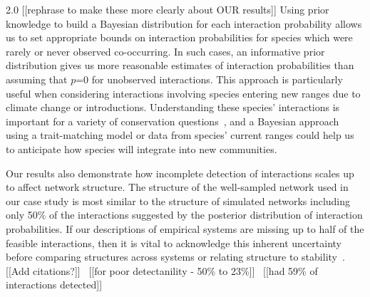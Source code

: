 \documentclass[12pt]{article}
\begin{document}
\begin{spacing}{2.0}
  [[rephrase to make these more clearly about OUR results]]
  Using prior knowledge to build a Bayesian distribution for each interaction probability allows us to set appropriate bounds on interaction probabilities for species which were rarely or never observed co-occurring. In such cases, an informative prior distribution gives us more reasonable estimates of interaction probabilities than assuming that $p$=0 for unobserved interactions. This approach is particularly useful when considering interactions involving species entering new ranges due to climate change or introductions. Understanding these species' interactions is important for a variety of conservation questions~\citep{Bartomeus2013,Gravel2013}, and a Bayesian approach using a trait-matching model or data from species' current ranges could help us to anticipate how species will integrate into new communities. 


  Our results also demonstrate how incomplete detection of interactions scales up to affect network structure. The structure of the well-sampled network used in our case study is most similar to the structure of simulated networks including only 50\% of the interactions suggested by the posterior distribution of interaction probabilities. If our descriptions of empirical systems are missing up to half of the feasible interactions, then it is vital to acknowledge this inherent uncertainty before comparing structures across systems or relating structure to stability~\citep{other studies pointing out poor detectability}.[[Add citations?]]
  ~\citep{Jordano2016,Weinstein2017a}[[for poor detectanility - 50\% to 23\%]]
  ~\citep{Bartomeus2013}[[had 59\% of interactions detected]]


\end{spacing}
\end{document}
